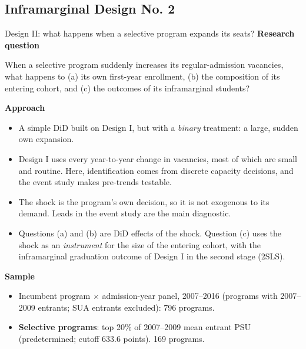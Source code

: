 \documentclass{beamer}
\begin{document}
\subsection{Inframarginal Design No. 2}
\begin{frame}{Design II: what happens when a selective program expands its seats?}
\scriptsize
\textbf{Research question}

When a selective program suddenly increases its regular-admission vacancies, what happens to
(a) its own first-year enrollment, (b) the composition of its entering cohort, and
(c) the outcomes of its inframarginal students?

\vspace{0.10cm}
\textbf{Approach}
\begin{itemize}
    \item A simple DiD built on Design I, but with a \emph{binary} treatment: a large, sudden own expansion.
    \item Design I uses every year-to-year change in vacancies, most of which are small and routine.
    Here, identification comes from discrete capacity decisions, and the event study makes pre-trends testable.
    \item The shock is the program's own decision, so it is not exogenous to its demand. Leads in the event study are the main diagnostic.
    \item Questions (a) and (b) are DiD effects of the shock. Question (c) uses the shock as an \emph{instrument} for the size of the entering cohort,
    with the inframarginal graduation outcome of Design I in the second stage (2SLS).
\end{itemize}

\vspace{0.06cm}
\textbf{Sample}
\begin{itemize}
    \item Incumbent program $\times$ admission-year panel, 2007--2016 (programs with 2007--2009 entrants; SUA entrants excluded): 796 programs.
    \item \textbf{Selective programs}: top 20\% of 2007--2009 mean entrant PSU (predetermined; cutoff 633.6 points). 169 programs.
\end{itemize}
\end{frame}
\end{document}

